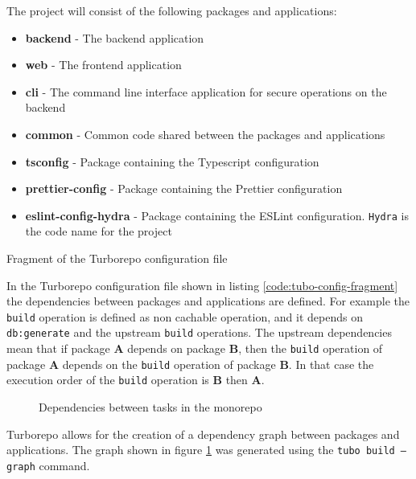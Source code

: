 \documentclass[../main.tex]{subfiles}
\begin{document}
The project will consist of the following packages and applications:
\begin{itemize}
  \item \textbf{backend} - The backend application
  \item \textbf{web} - The frontend application
  \item \textbf{cli} - The command line interface application for secure operations on the backend
  \item \textbf{common} - Common code shared between the packages and applications
  \item \textbf{tsconfig} - Package containing the Typescript configuration
  \item \textbf{prettier-config} - Package containing the Prettier configuration
  \item \textbf{eslint-config-hydra} - Package containing the ESLint configuration. \texttt{Hydra} is the code name for the project

\end{itemize}

\begin{listing}[H]
  \caption{Fragment of the Turborepo configuration file}
  \label{code:tubo-config-fragment}
\end{listing}

In the Turborepo configuration file shown in listing \ref{code:tubo-config-fragment} the dependencies between packages and applications are defined.
For example the \texttt{build} operation is defined as non cachable operation, and it depends on \texttt{db:generate} and the upstream \texttt{build} operations.
The upstream dependencies mean that if package \textbf{A} depends on package \textbf{B}, then the \texttt{build} operation of package \textbf{A} depends on the \texttt{build} operation of package \textbf{B}.
In that case the execution order of the \texttt{build} operation is \textbf{B} then \textbf{A}.


\begin{figure}[H]
  \centering
  
  \caption{Dependencies between tasks in the monorepo}
  \label{fig:monorepo_dependency_graph}
\end{figure}

Turborepo allows for the creation of a dependency graph between packages and applications. The graph shown in figure \ref{fig:monorepo_dependency_graph} was generated using the \texttt{tubo build --graph} command.
\end{document}
